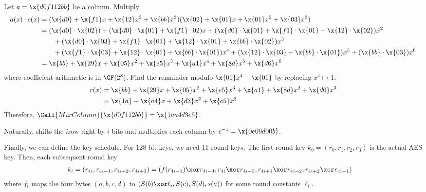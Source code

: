 \documentclass[class=co487,tikz,minted,notes]{agony}
\begin{document}
\begin{example}\label{exa:mixcolumn}
  Let $a = \x{d0f112bb}$ be a column.
  Multiply
  \begin{align*}
    a(x) \cdot c(x)
     & = (\x{d0} + \x{f1}x + \x{12}x^2 + \x{bb}x^3)(\x{02} + \x{01}x + \x{01}x^2 + \x{03}x^3)                                                            \\
     & = (\x{d0}\cdot\x{02}) + (\x{d0}\cdot\x{01} + \x{f1}\cdot{02})x + (\x{d0}\cdot\x{01} + \x{f1}\cdot\x{01} + \x{12}\cdot\x{02})x^2                   \\
     & \quad\quad + (\x{d0}\cdot\x{03} + \x{f1}\cdot\x{01} + \x{12}\cdot\x{01} + \x{bb}\cdot\x{02})x^3                                                   \\
     & \quad\quad + (\x{f1}\cdot\x{03} + \x{12}\cdot\x{01} + \x{bb}\cdot\x{01})x^4 + (\x{12}\cdot\x{03} + \x{bb}\cdot\x{01})x^5 + (\x{bb}\cdot\x{03})x^6 \\
     & = \x{bb} + \x{29}x + \x{05}x^2 + \x{e5}x^3 + \x{a1}x^4 + \x{8d}x^5 + \x{d6}x^6
  \end{align*}
  where coefficient arithmetic is in $\GF(2^8)$.
  Find the remainder modulo $\x{01}x^4-\x{01}$
  by replacing $x^4 \mapsto 1$:
  \begin{align*}
    r(x) & = \x{bb} + \x{29}x + \x{05}x^2 + \x{e5}x^3 + \x{a1} + \x{8d}x^2 + \x{d6}x^3 \\
         & = \x{1a} + \x{a4}x + \x{d3}x^2 + \x{e5}x^3
  \end{align*}
  Therefore, $\Call{MixColumn}{\x{d0f112bb}} = \x{1aa4d3e5}$.
\end{example}

Naturally,  shifts the $i$\xth row right by $i$ bits
and  multiplies each column by $c^{-1} = \x{0e09d00b}$.

Finally, we can define the key schedule.
For 128-bit keys, we need 11 round keys.
The first round key $k_0 = (r_0,r_1,r_2,r_3)$ is the actual AES key.
Then, each subsequent round key
\begin{align*}
  k_i & = (r_{4i},r_{4i+1},r_{4i+2},r_{4i+3}) = (f(r_{4i-1})\xor r_{4i-4}, r_{4i} \xor r_{4i-3}, r_{4i+1} \xor r_{4i-2}, r_{4i+2} \xor r_{4i-1})
\end{align*}
where $f_i$ maps the four bytes $(a,b,c,d)$ to $(S(b) \xor \ell_i, S(c), S(d), s(a))$
for some round constants $\ell_i$.
\end{document}
